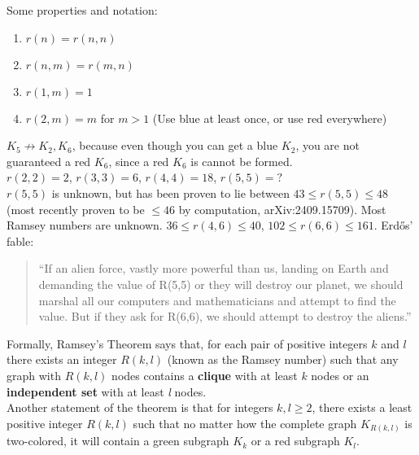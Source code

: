 \documentclass[12pt]{extarticle}
\begin{document}
Some properties and notation: 
\begin{enumerate}
\item $r(n)=r(n,n)$
\item $r(n,m)=r(m,n)$
\item $r(1,m)=1$
\item $r(2,m)=m$ for $m>1$ (Use blue at least once, or use red everywhere)
\end{enumerate}
$K_{5}\not \to K_{2},K_{6}$, because even though you can get a blue $K_{2}$, you are not guaranteed a red $K_{6}$, since a red $K_{6}$ is cannot be formed.\\
$r(2,2)=2$, $r(3,3)=6$, $r(4,4)=18$, $r(5,5)=?$ \\
$r(5,5)$ is unknown, but has been proven to lie between $43\leq r(5,5)\leq 48$ (most recently proven to be $\leq 46$ by computation, arXiv:2409.15709). Most Ramsey numbers are unknown. $36\leq r(4,6)\leq 40$, $102\leq r(6,6)\leq 161$. Erdős' fable: \begin{quote} ``If an alien force, vastly more powerful than us, landing on Earth and demanding the value of R(5,5) or they will destroy our planet, we should marshal all our computers and mathematicians and attempt to find the value. But if they ask for R(6,6), we should attempt to destroy the aliens.'' \end{quote} 
Formally, Ramsey's Theorem says that, for each pair of positive integers $k$ and $l$ there exists an integer $R(k,l)$ (known as the Ramsey number) such that any graph with $R(k,l)$ nodes contains a \textbf{clique} with at least $k$ nodes or an \textbf{independent set} with at least \emph{l} nodes.\\
Another statement of the theorem is that for integers $k,l\geq2$, there exists a least positive integer $R(k,l)$ such that no matter how the complete graph $K_{R(k,l)}$ is two-colored, it will contain a green subgraph $K_k$ or a red subgraph $K_l$.
\end{document}
